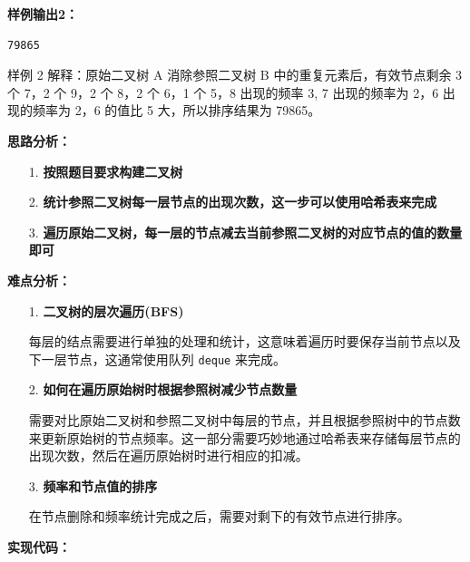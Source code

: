 \documentclass[a4paper]{ctexart}
\begin{document}
\noindent\textbf{样例输出2：}
\lstset{numbers=none}
\begin{lstlisting}
79865
\end{lstlisting}
\lstset{numbers=left}

\noindent 样例 2 解释：原始二叉树 A 消除参照二叉树 B 中的重复元素后，有效节点剩余 3 个 7，2 个 9，2 个 8，2 个 6，1 个 5，8 出现的频率 3, 7 出现的频率为 2，6 出现的频率为 2，6 的值比 5 大，所以排序结果为 79865。
	
\vspace{10pt}
	
\noindent\textbf{思路分析：}
\begin{itemize}
	\item [1.] \textbf{按照题目要求构建二叉树} 
	
	\item [2.] \textbf{统计参照二叉树每一层节点的出现次数，这一步可以使用哈希表来完成}
	
	\item [3.] \textbf{遍历原始二叉树，每一层的节点减去当前参照二叉树的对应节点的值的数量即可}
\end{itemize}

\noindent\textbf{难点分析：}
\begin{itemize}
	\item [1.] \textbf{二叉树的层次遍历(BFS)}
	
	每层的结点需要进行单独的处理和统计，这意味着遍历时要保存当前节点以及下一层节点，这通常使用队列 \texttt{deque} 来完成。
	
	\item [2.] \textbf{如何在遍历原始树时根据参照树减少节点数量}
	
	需要对比原始二叉树和参照二叉树中每层的节点，并且根据参照树中的节点数来更新原始树的节点频率。这一部分需要巧妙地通过哈希表来存储每层节点的出现次数，然后在遍历原始树时进行相应的扣减。
	
	\item [3.] \textbf{频率和节点值的排序}
	
	在节点删除和频率统计完成之后，需要对剩下的有效节点进行排序。
	
\end{itemize}

\noindent\textbf{实现代码：}
	
\end{document}

